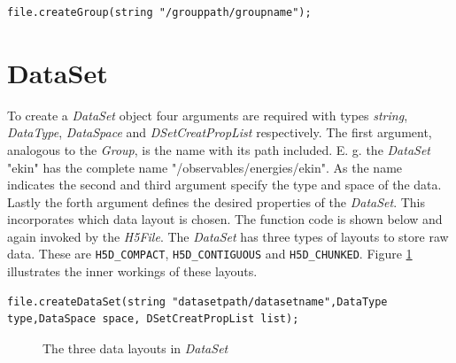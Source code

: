 \begin{lstlisting}
file.createGroup(string "/grouppath/groupname");
\end{lstlisting}

\section{DataSet}
\label{seq:dataset}
To create a \textit{DataSet} object four arguments are required with types \textit{string}, \textit{DataType}, \textit{DataSpace} and \textit{DSetCreatPropList} respectively. The first argument, analogous to the \textit{Group}, is the name with its path included. E. g. the \textit{DataSet} "ekin" has the complete name "/observables/energies/ekin". As the name indicates the second and third argument specify the type and space of the data. Lastly the forth argument defines the desired properties of the \textit{DataSet}. This incorporates which data layout is chosen. The function code is shown below and again invoked by the \textit{H5File}. The \textit{DataSet} has three types of layouts to store raw data. These are \texttt{H5D\_COMPACT}, \texttt{H5D\_CONTIGUOUS} and \texttt{H5D\_CHUNKED}. Figure \ref{fig:datalayout} illustrates the inner workings of these layouts.

\begin{lstlisting}
file.createDataSet(string "datasetpath/datasetname",DataType type,DataSpace space, DSetCreatPropList list);
\end{lstlisting}

\begin{figure}[ht!]
\caption{The three data layouts in \textit{DataSet}}
\label{fig:datalayout}
\end{figure}

